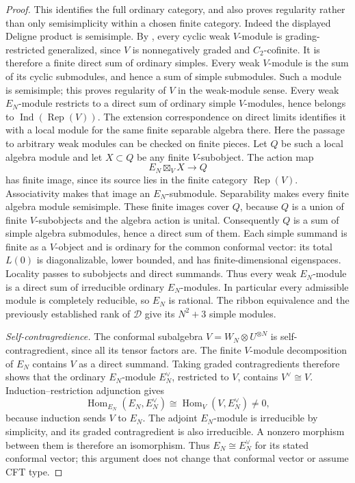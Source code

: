 \documentclass[11pt,a4paper]{article}
\numberwithin{equation}{section}
\theoremstyle{definition}\newtheorem{definition}[theorem]{Definition}
\theoremstyle{remark}\newtheorem{remark}[theorem]{Remark}
\begin{document}
\begin{proof}
This identifies the full ordinary category, and also proves
regularity rather than only semisimplicity within a chosen finite
category. Indeed the displayed Deligne product is semisimple. By
\cite[Proposition 2.11]{mcrae}, every cyclic weak $V$-module is
grading-restricted generalized, since $V$ is nonnegatively graded
and $C_2$-cofinite. It is therefore a finite direct sum of ordinary
simples. Every weak $V$-module is the sum of its cyclic submodules,
and hence a sum of simple submodules. Such a module is semisimple;
this proves regularity of $V$ in the weak-module sense.
Every weak $E_N$-module restricts to a direct
sum of ordinary simple $V$-modules, hence belongs to
$\operatorname{Ind}(\operatorname{Rep}(V))$.
The extension correspondence on direct limits
\cite[Theorems 7.5 and 7.7]{cmy} identifies it with a local
module for the same finite separable algebra there.
Here the passage to arbitrary weak modules can be checked on finite
pieces. Let $Q$ be such a local algebra module and let $X\subset Q$
be any finite $V$-subobject. The action map
\[
                       E_N\boxtimes_V X\longrightarrow Q
\]
has finite image, since its source lies in the finite category
$\operatorname{Rep}(V)$. Associativity makes that image an
$E_N$-submodule. Separability makes every finite algebra module
semisimple. These finite images cover $Q$, because $Q$ is a union
of finite $V$-subobjects and the algebra action is unital.
Consequently $Q$ is a sum of simple algebra submodules, hence a
direct sum of them. Each simple summand is finite as a $V$-object
and is ordinary for the common conformal vector: its total $L(0)$
is diagonalizable, lower bounded, and has finite-dimensional
eigenspaces. Locality passes to subobjects and direct summands.
Thus every weak $E_N$-module is a direct sum of irreducible
ordinary $E_N$-modules.
In particular every admissible module is completely reducible,
so $E_N$ is rational. The ribbon equivalence and the previously
established rank of $\mathcal D$ give its $N^2+3$ simple modules.

\emph{Self-contragredience.}
The conformal subalgebra $V=W_N\otimes U^{\otimes N}$ is
self-contragredient, since all its tensor factors are.
The finite $V$-module decomposition of $E_N$ contains $V$ as a
direct summand. Taking graded contragredients therefore shows that
the ordinary $E_N$-module $E_N^\vee$, restricted to $V$, contains
$V^\vee\cong V$. Induction--restriction adjunction
\cite[Lemma 2.61 and Theorem 3.65]{ckm} gives
\[
 \operatorname{Hom}_{E_N}(E_N,E_N^\vee)
 \cong\operatorname{Hom}_{V}(V,E_N^\vee)\ne0,
\]
because induction sends $V$ to $E_N$. The adjoint $E_N$-module is
irreducible by simplicity, and its graded contragredient is also
irreducible. A nonzero morphism between them is therefore an
isomorphism. Thus $E_N\cong E_N^\vee$ for its stated conformal
vector; this argument does not change that conformal vector or
assume CFT type.


\end{proof}
\end{document}
